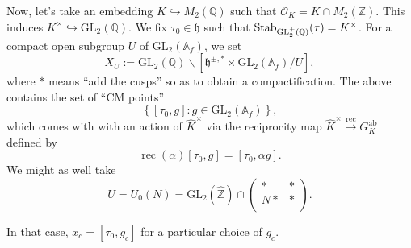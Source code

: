 \documentclass[reqno]{amsart} 
\numberwithin{theorem}{section}
\numberwithin{equation}{section}
\numberwithin{exercise}{section}
\begin{document}
Now, let's take an embedding $K \hookrightarrow M_2(\mathbb{Q})$ such that $\mathcal{O}_K = K \cap M_2(\mathbb{Z})$.  This induces $K^\times \hookrightarrow \mathrm{GL}_2(\mathbb{Q})$.  We fix $\tau_0 \in \mathfrak{h}$ such that $\operatorname{Stab}_{\mathrm{GL}_2^+(\mathbb{Q})}(\tau) = K^\times$.  For a compact open subgroup $U$ of $\mathrm{GL}_2(\mathbb{A}_f)$, we set
\begin{equation*}
  X_U := \mathrm{GL}_2(\mathbb{Q}) \backslash[\mathfrak{h}^{\pm, \ast} \times \mathrm{GL}_2(\mathbb{A}_f) / U],
\end{equation*}
where $\ast$ means ``add the cusps'' so as to obtain a compactification.    The above contains the set of ``CM points''
\begin{equation*}
  \left\{[\tau_0, g] : g \in \mathrm{GL}_2(\mathbb{A}_f) \right\},
\end{equation*}
which comes with with an action of $\hat{K}^\times$ via the reciprocity map $\hat{K}^\times \xrightarrow{\mathrm{rec}} G_K^{\mathrm{ab}}$ defined by
\begin{equation*}
  \operatorname{rec}(\alpha)[\tau_0, g]
  =[\tau_0, \alpha g].
\end{equation*}
We might as well take
\begin{equation*}
  U = U_0(N) = \mathrm{GL}_2(\hat{\mathbb{Z}}) \cap
  \begin{pmatrix}
    \ast    & \ast \\
    N \ast            &  \ast \\
  \end{pmatrix}.
\end{equation*}

In that case, $x_c =[\tau_0, g_c]$ for a particular choice of $g_c$.
\end{document}
